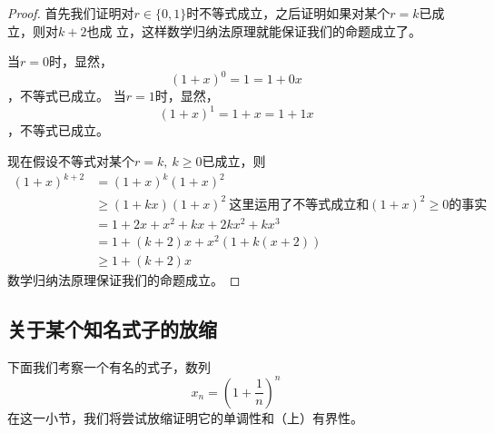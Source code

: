 \begin{proof}
首先我们证明对$r \in \{0,1\}$时不等式成立，之后证明如果对某个$r = k$已成立，则对$k + 2$也成
立，这样数学归纳法原理就能保证我们的命题成立了。

当$r = 0$时，显然，
\[
(1+x)^0 = 1 = 1 + 0x
\]，不等式已成立。
当$r = 1$时，显然，
\[
(1+x)^1 = 1 + x = 1 + 1x
\]，不等式已成立。

现在假设不等式对某个$r = k,\ k \geq 0$已成立，则
\begin{align}
(1+x)^{k+2} 
&= (1+x)^k(1+x)^2 \nonumber \\
&\geq (1+kx)(1+x)^2 \ \text{这里运用了不等式成立和}(1+x)^2\geq 0\text{的事实}
\nonumber \\
&= 1 + 2x + x^2 + kx + 2kx^2 + kx^3  \nonumber \\
&= 1 + (k+2)x + x^2(1 + k(x+2)) \nonumber \\
&\geq 1 + (k+2)x
\end{align}
数学归纳法原理保证我们的命题成立。
\end{proof}

\subsection{关于某个知名式子的放缩}
下面我们考察一个有名的式子，数列
\[
x_n = (1 + \frac{1}{n})^n
\]
在这一小节，我们将尝试放缩证明它的单调性和（上）有界性。

